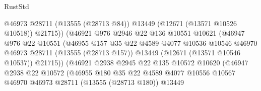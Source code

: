 \begin{lexlean}{RustStd}
\begin{coremodule}
                                      @46973
                                      @28711
                                      (@13555 (@28713 @84))
                                      @13449
                                      (@12671 (@13571 @10526 @10518))
                                      @21715))
                                  (@46921
                                    @976
                                    @2946
                                    @22
                                    @136
                                    @10551
                                    @10621
                                    (@46947
                                      @976
                                      @22
                                      @10551
                                      (@46955
                                        @157
                                        @35
                                        @22
                                        @4589
                                        @4077
                                        @10536
                                        @10546
                                        @46970
                                        @46973
                                        @28711
                                        (@13555 (@28713 @157))
                                        @13449
                                        (@12671 (@13571 @10546 @10537))
                                        @21715))
                                    (@46921
                                      @2938
                                      @2945
                                      @22
                                      @135
                                      @10572
                                      @10620
                                      (@46947
                                        @2938
                                        @22
                                        @10572
                                        (@46955
                                          @180
                                          @35
                                          @22
                                          @4589
                                          @4077
                                          @10556
                                          @10567
                                          @46970
                                          @46973
                                          @28711
                                          (@13555 (@28713 @180))
                                          @13449

\end{coremodule}
\end{lexlean}

